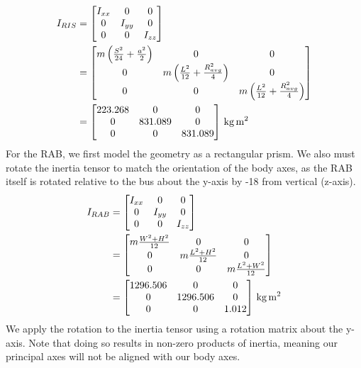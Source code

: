 \begin{align*}
I_{RIS} &=
\begin{bmatrix}
I_{xx} & 0 & 0 \\
0 & I_{yy} & 0 \\
0 & 0 & I_{zz}
\end{bmatrix} \\
&=
\begin{bmatrix}
m \left(\frac{S^{2}}{24} + \frac{a^{2}}{2}\right) & 0 & 0 \\
0 & m \left(\frac{L^{2}}{12} + \frac{R_{avg}^{2}}{4}\right) & 0 \\
0 & 0 & m \left(\frac{L^{2}}{12} + \frac{R_{avg}^{2}}{4}\right) 
\end{bmatrix} \\
&=
\qty[parse-numbers = false]{
\begin{bmatrix}
223.268 & 0 & 0 \\
0 & 831.089 & 0 \\
0 & 0 & 831.089 
\end{bmatrix}
}{\kilogram\metre\squared}
\end{align*}
For the RAB, we first model the geometry as a rectangular prism. We also must rotate the inertia tensor to match the orientation of the body axes, as the RAB itself is rotated relative to the bus about the y-axis by -18\degree{} from vertical (z-axis).
\begin{align*}
I_{RAB} &=
\begin{bmatrix}
I_{xx} & 0 & 0 \\
0 & I_{yy} & 0 \\
0 & 0 & I_{zz}
\end{bmatrix} \\
&=
\begin{bmatrix}
m \frac{W^{2} + H^{2}}{12} & 0 & 0 \\
0 & m \frac{L^{2} + H^{2}}{12} & 0 \\
0 & 0 & m \frac{L^{2} + W^{2}}{12} 
\end{bmatrix} \\
&=
\qty[parse-numbers = false]{
\begin{bmatrix}
1296.506 & 0 & 0 \\
0 & 1296.506 & 0 \\
0 & 0 & 1.012 
\end{bmatrix}
}{\kilogram\metre\squared}
\end{align*}
We apply the rotation to the inertia tensor using a rotation matrix about the y-axis. Note that doing so results in non-zero products of inertia, meaning our principal axes will not be aligned with our body axes.
